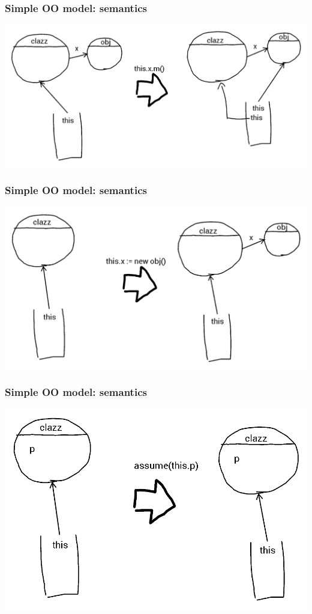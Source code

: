 \documentclass{beamer}
\begin{document}
\begin{frame}
  \frametitle{Simple OO model: semantics}
  \includegraphics[width=\linewidth]{call}
\end{frame}

\begin{frame}
  \frametitle{Simple OO model: semantics}
  \includegraphics[width=\linewidth]{new}
\end{frame}

\begin{frame}
  \frametitle{Simple OO model: semantics}
  \includegraphics[width=\linewidth]{assume_pass}
\end{frame}
\end{document}
